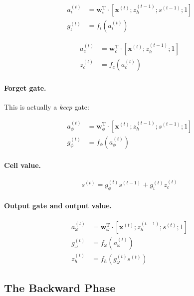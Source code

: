 \documentclass[11pt]{article}
\begin{document}
\begin{align}
a_{\iota}^{(t)} &= \mathbf{w}_{\iota}^{\text{T}} \cdot \left[\mathbf{x}^{(t)}; z_{h}^{(t-1)}; s^{(t-1)}; 1\right] \\
g_{\iota}^{(t)} &= f_{\iota}\left(a_{\iota}^{(t)}\right)
\end{align}

\begin{align}
a_{c}^{(t)} &= \mathbf{w}_{c}^{\text{T}} \cdot \left[\mathbf{x}^{(t)}; z_{h}^{(t-1)}; 1\right] \\
z_{c}^{(t)} &= f_{c}\left(a_{c}^{(t)}\right)
\end{align}

\paragraph{Forget gate.} This is actually a \emph{keep} gate:

\begin{align}
a_{\phi}^{(t)} &= \mathbf{w}_{\phi}^{\text{T}} \cdot \left[\mathbf{x}^{(t)}; z_{h}^{(t-1)}; s^{(t-1)}; 1\right] \\
g_{\phi}^{(t)} &= f_{\phi}\left(a_{\phi}^{(t)}\right)
\end{align}

\paragraph{Cell value.}

\begin{equation}
    s^{(t)} = g_{\phi}^{(t)} s^{(t-1)} + g_{\iota}^{(t)} z_{c}^{(t)}
\end{equation}

\paragraph{Output gate and output value.}

\begin{align}
a_{\omega}^{(t)} &= \mathbf{w}_{\omega}^{\text{T}} \cdot \left[\mathbf{x}^{(t)}; z_{h}^{(t-1)}; s^{(t)}; 1\right] \\
g_{\omega}^{(t)} &= f_{\omega}\left(a_{\omega}^{(t)}\right) \\
z_h^{(t)} &= f_h\left(g_{\omega}^{(t)} s^{(t)}\right)
\end{align}

\subsection{The Backward Phase}
\end{document}
